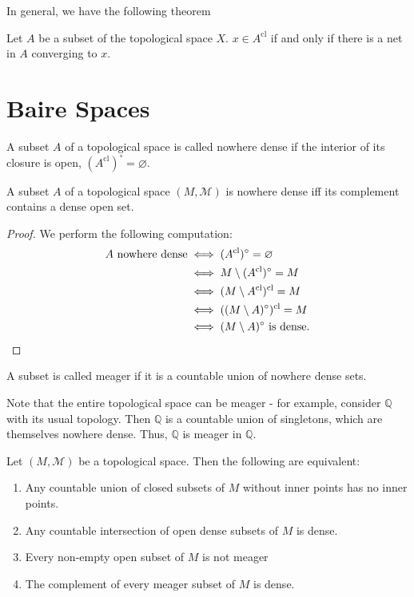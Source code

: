 \documentclass[twoside,symmetric, openany, 12pt]{./tuftebook}
\theoremstyle{definition}
\theoremstyle{definition}
\theoremstyle{definition}
\newenvironment{parts}{\begin{enumerate}[label=(\alph*)]}{\end{enumerate}}
\newcommand{\Q}{\mathbb{Q}}
\begin{document}
In general, we have the following theorem

\begin{Theorem}
	Let $A$ be a subset of the topological space $X$. $x\in A^\text{cl}$ if and only if there is a net in $A$ converging to $x$.
\end{Theorem}
\section{Baire Spaces}\label{subsec:baire}
	\begin{Definition}
		A subset $A$ of a topological space is called nowhere dense if the interior of its closure is open, $(A^\text{cl})^\circ=\varnothing$. 
	\end{Definition}
\begin{Theorem}
	A subset $A$ of a topological space $(M, \mathcal{M})$ is nowhere dense iff its complement contains a dense open set.
\end{Theorem}
\begin{proof}
		We perform the following computation:
		\begin{align*}
			A\text{ nowhere dense}&\iff (A^\text{cl})^\circ = \varnothing\\
			&\iff M \setminus (A^\text{cl})^\circ = M\\
			&\iff (M \setminus A^\text{cl})^\text{cl}=M\\
			&\iff ((M \setminus A)^\circ)^\text{cl}=M\\
			&\iff (M \setminus A)^\circ\text{ is dense}.\qedhere
		\end{align*}
\end{proof}
\begin{Definition}[Meager]
	A subset is called meager if it is a countable union of nowhere dense sets.
\end{Definition}
Note that the entire topological space can be meager - for example, consider $\Q$ with its usual topology. Then $\Q$ is a countable union of singletons, which are themselves nowhere dense. Thus, $\Q$ is meager in $\Q$.
\begin{Theorem}\label{thm:bairecond}
	Let $(M, \mathcal{M})$ be a topological space. Then the following are equivalent:
	\begin{parts}
		\item Any countable union of closed subsets of $M$ without inner points has no inner points.
		\item Any countable intersection of open dense subsets of $M$ is dense.
		\item Every non-empty open subset of $M$ is not meager
		\item The complement of every meager subset of $M$ is dense.
	\end{parts}
\end{Theorem}
\end{document}
